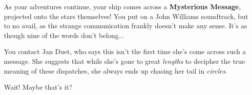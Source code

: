 As your adventures continue, your ship comes across a \textbf{Mysterious
Message}, projected onto the stars themselves! You put on a John
Williams soundtrack, but to no avail, as the strange communication
frankly doesn't make any sense. It's as though nine of the
words don't belong...

You contact Jan Duet, who says this isn't the first time she's
come across such a message. She suggests that while she's gone
to great \textit{lengths} to decipher the true meaning of
these dispatches, she always ends up chasing her tail in
\textit{circles}.

Wait! Maybe that's it? 
